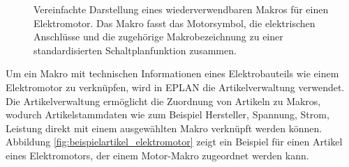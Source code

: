 \begin{figure}[H]
    \caption{ Vereinfachte Darstellung eines wiederverwendbaren Makros für einen Elektromotor. Das Makro fasst das Motorsymbol, die elektrischen Anschlüsse und die zugehörige Makrobezeichnung zu einer standardisierten Schaltplanfunktion zusammen. } 
    \label{fig:elektromotor} 
\end{figure}



Um ein Makro mit technischen Informationen eines Elektrobauteils wie einem Elektromotor zu verknüpfen, wird in EPLAN die Artikelverwaltung verwendet. 
Die Artikelverwaltung ermöglicht die Zuordnung von Artikeln zu Makros, wodurch Artikelstammdaten wie zum Beispiel Hersteller, Spannung, Strom, 
Leistung direkt mit einem ausgewählten Makro verknüpft werden können. Abbildung \ref{fig:beispielartikel_elektromotor} zeigt ein Beispiel für einen Artikel eines Elektromotors, der einem Motor-Makro zugeordnet werden kann.
\parencite{EPLAN2023Artikelverwaltung}


